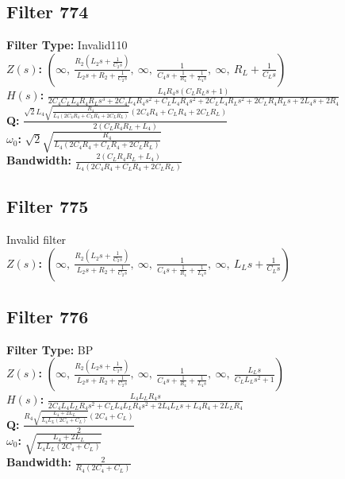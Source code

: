 \documentclass{article}
\begin{document}
\subsection*{Filter 774}
\textbf{Filter Type:} Invalid110 \\ 
\textbf{$Z(s)$:} $\left( \infty, \  \frac{R_{2} \left(L_{2} s + \frac{1}{C_{2} s}\right)}{L_{2} s + R_{2} + \frac{1}{C_{2} s}}, \  \infty, \  \frac{1}{C_{4} s + \frac{1}{R_{4}} + \frac{1}{L_{4} s}}, \  \infty, \  R_{L} + \frac{1}{C_{L} s}\right)$ \\ 
\textbf{$H(s)$:} $\frac{L_{4} R_{4} s \left(C_{L} R_{L} s + 1\right)}{2 C_{4} C_{L} L_{4} R_{4} R_{L} s^{3} + 2 C_{4} L_{4} R_{4} s^{2} + C_{L} L_{4} R_{4} s^{2} + 2 C_{L} L_{4} R_{L} s^{2} + 2 C_{L} R_{4} R_{L} s + 2 L_{4} s + 2 R_{4}}$ \\ 
\textbf{Q:} $\frac{\sqrt{2} L_{4} \sqrt{\frac{R_{4}}{L_{4} \left(2 C_{4} R_{4} + C_{L} R_{4} + 2 C_{L} R_{L}\right)}} \left(2 C_{4} R_{4} + C_{L} R_{4} + 2 C_{L} R_{L}\right)}{2 \left(C_{L} R_{4} R_{L} + L_{4}\right)}$ \\ 
\textbf{$\omega_0$:} $\sqrt{2} \sqrt{\frac{R_{4}}{L_{4} \left(2 C_{4} R_{4} + C_{L} R_{4} + 2 C_{L} R_{L}\right)}}$ \\ 
\textbf{Bandwidth:} $\frac{2 \left(C_{L} R_{4} R_{L} + L_{4}\right)}{L_{4} \left(2 C_{4} R_{4} + C_{L} R_{4} + 2 C_{L} R_{L}\right)}$ \\ 
\subsection*{Filter 775}
Invalid filter \\ 
\textbf{$Z(s)$:} $\left( \infty, \  \frac{R_{2} \left(L_{2} s + \frac{1}{C_{2} s}\right)}{L_{2} s + R_{2} + \frac{1}{C_{2} s}}, \  \infty, \  \frac{1}{C_{4} s + \frac{1}{R_{4}} + \frac{1}{L_{4} s}}, \  \infty, \  L_{L} s + \frac{1}{C_{L} s}\right)$ \\ 
\subsection*{Filter 776}
\textbf{Filter Type:} BP \\ 
\textbf{$Z(s)$:} $\left( \infty, \  \frac{R_{2} \left(L_{2} s + \frac{1}{C_{2} s}\right)}{L_{2} s + R_{2} + \frac{1}{C_{2} s}}, \  \infty, \  \frac{1}{C_{4} s + \frac{1}{R_{4}} + \frac{1}{L_{4} s}}, \  \infty, \  \frac{L_{L} s}{C_{L} L_{L} s^{2} + 1}\right)$ \\ 
\textbf{$H(s)$:} $\frac{L_{4} L_{L} R_{4} s}{2 C_{4} L_{4} L_{L} R_{4} s^{2} + C_{L} L_{4} L_{L} R_{4} s^{2} + 2 L_{4} L_{L} s + L_{4} R_{4} + 2 L_{L} R_{4}}$ \\ 
\textbf{Q:} $\frac{R_{4} \sqrt{\frac{L_{4} + 2 L_{L}}{L_{4} L_{L} \left(2 C_{4} + C_{L}\right)}} \left(2 C_{4} + C_{L}\right)}{2}$ \\ 
\textbf{$\omega_0$:} $\sqrt{\frac{L_{4} + 2 L_{L}}{L_{4} L_{L} \left(2 C_{4} + C_{L}\right)}}$ \\ 
\textbf{Bandwidth:} $\frac{2}{R_{4} \left(2 C_{4} + C_{L}\right)}$ \\ 
\end{document}
